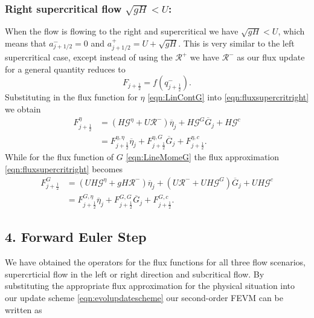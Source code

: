 \subsubsection{Right supercritical flow $\sqrt{gH} < U$:}
When the flow is flowing to the right and supercritical we have $ \sqrt{gH} < U $, which means that $a^-_{j+ 1/2} = 0$ and $a^+_{j+ 1/2} =  U + \sqrt{g H}$. This is very similar to the left supercritical case, except instead of using the $\mathcal{R}^+$ we have $\mathcal{R}^-$ as our flux update for a general quantity reduces to
\begin{equation}
F_{j+\frac{1}{2}} = f\left(q^-_{j+\frac{1}{2}}\right).
\label{eqn:fluxsupercritright}
\end{equation}
Substituting in the flux function for $\eta$ \eqref{eqn:LinContG} into \eqref{eqn:fluxsupercritright} we obtain
\begin{align}
F^\eta_{j+\frac{1}{2}} &= \left(H \mathcal{G}^{\eta} + U \mathcal{R}^- \right)  \overline{\eta}_{j} + H \mathcal{G}^G \overline{G}_{j} + H\mathcal{G}^c \nonumber \\
&= F^{\eta, \eta}_{j+\frac{1}{2}} \overline{\eta}_{j} + F^{\eta, G}_{j+\frac{1}{2}} \overline{G}_{j} + F^{\eta, c}_{j+\frac{1}{2}}.
\label{eqn:Fluxfactorsupercritetaright}
\end{align}
While for the flux function of $G$ \eqref{eqn:LineMomeG} the flux approximation  \eqref{eqn:fluxsupercritright} becomes
\begin{align}
F^G_{j+\frac{1}{2}}  &= \left(UH \mathcal{G}^{\eta} + gH \mathcal{R}^- \right)  \overline{\eta}_{j} + \left(U\mathcal{R}^- +  UH \mathcal{G}^G \right) \overline{G}_{j} + UH\mathcal{G}^c \nonumber \\
&= F^{G, \eta}_{j+\frac{1}{2}} \overline{\eta}_{j} + F^{G, G}_{j+\frac{1}{2}} \overline{G}_{j} + F^{G, c}_{j+\frac{1}{2}}.
\label{eqn:FluxfactorsupercritGright}
\end{align}


\subsection{4. Forward Euler Step}
We have obtained the operators for the flux functions for all three flow scenarios, supercrticial flow in the left or right direction and subcritical flow. By substituting the appropriate flux approximation for the physical situation into our update scheme \eqref{eqn:evolupdatescheme} our second-order FEVM can be written as

